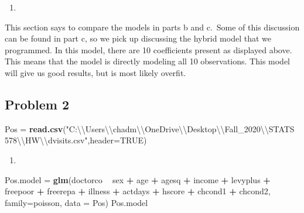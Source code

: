 \documentclass[
]{article}
\newenvironment{Shaded}{\begin{snugshade}}{\end{snugshade}}
\newcommand{\CharTok}[1]{\textcolor[rgb]{0.31,0.60,0.02}{#1}}
\newcommand{\DataTypeTok}[1]{\textcolor[rgb]{0.13,0.29,0.53}{#1}}
\newcommand{\KeywordTok}[1]{\textcolor[rgb]{0.13,0.29,0.53}{\textbf{#1}}}
\newcommand{\NormalTok}[1]{#1}
\newcommand{\OperatorTok}[1]{\textcolor[rgb]{0.81,0.36,0.00}{\textbf{#1}}}
\newcommand{\OtherTok}[1]{\textcolor[rgb]{0.56,0.35,0.01}{#1}}
\newcommand{\StringTok}[1]{\textcolor[rgb]{0.31,0.60,0.02}{#1}}
\begin{document}
\begin{enumerate}
\def\labelenumi{\alph{enumi})}
\setcounter{enumi}{3}
\item
\end{enumerate}

This section says to compare the models in parts b and c.~Some of this
discussion can be found in part c, so we pick up discussing the hybrid
model that we programmed. In this model, there are 10 coefficients
present as displayed above. This means that the model is directly
modeling all 10 observations. This model will give us good results, but
is most likely overfit.

\hypertarget{problem-2}{%
\subsection{Problem 2}\label{problem-2}}

\begin{Shaded}
\begin{Highlighting}[]
\NormalTok{Pos =}\StringTok{ }\KeywordTok{read.csv}\NormalTok{(}\StringTok{"C:}\CharTok{\textbackslash{}\textbackslash{}}\StringTok{Users}\CharTok{\textbackslash{}\textbackslash{}}\StringTok{chadm}\CharTok{\textbackslash{}\textbackslash{}}\StringTok{OneDrive}\CharTok{\textbackslash{}\textbackslash{}}\StringTok{Desktop}\CharTok{\textbackslash{}\textbackslash{}}\StringTok{Fall_2020}\CharTok{\textbackslash{}\textbackslash{}}\StringTok{STATS 578}\CharTok{\textbackslash{}\textbackslash{}}\StringTok{HW}\CharTok{\textbackslash{}\textbackslash{}}\StringTok{dvisits.csv"}\NormalTok{,}\DataTypeTok{header=}\OtherTok{TRUE}\NormalTok{)}
\end{Highlighting}
\end{Shaded}

\begin{enumerate}
\def\labelenumi{\alph{enumi})}
\item
\end{enumerate}

\begin{Shaded}
\begin{Highlighting}[]
\NormalTok{Pos.model =}\StringTok{ }\KeywordTok{glm}\NormalTok{(doctorco }\OperatorTok{~}\StringTok{ }\NormalTok{sex }\OperatorTok{+}\StringTok{ }\NormalTok{age }\OperatorTok{+}\StringTok{ }\NormalTok{agesq }\OperatorTok{+}\StringTok{ }\NormalTok{income }\OperatorTok{+}\StringTok{ }\NormalTok{levyplus }\OperatorTok{+}\StringTok{ }\NormalTok{freepoor }\OperatorTok{+}\StringTok{ }\NormalTok{freerepa }\OperatorTok{+}\StringTok{ }\NormalTok{illness }\OperatorTok{+}\StringTok{ }\NormalTok{actdays }\OperatorTok{+}\StringTok{ }\NormalTok{hscore }\OperatorTok{+}\StringTok{ }\NormalTok{chcond1 }\OperatorTok{+}\StringTok{ }\NormalTok{chcond2, }\DataTypeTok{family=}\NormalTok{poisson, }\DataTypeTok{data =}\NormalTok{ Pos)}
\NormalTok{Pos.model}
\end{Highlighting}
\end{Shaded}
\end{document}
